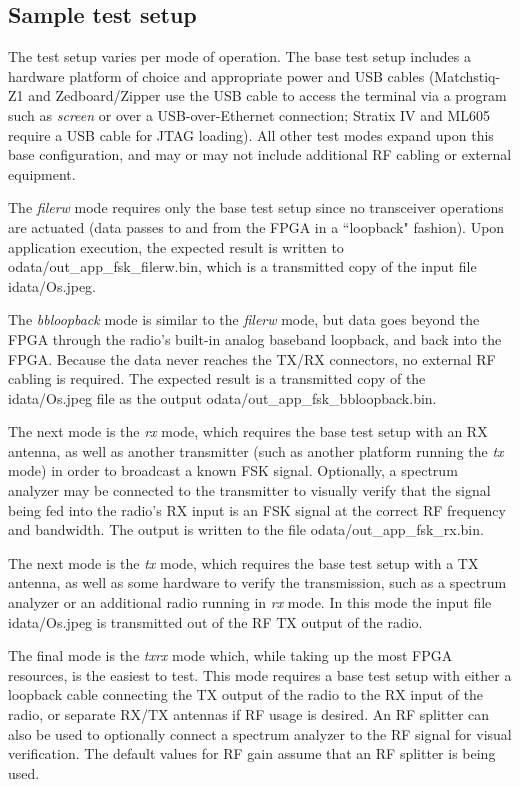 \subsection{Sample test setup}
The test setup varies per mode of operation. The base test setup includes a hardware platform of choice and appropriate power and USB cables (Matchstiq-Z1 and Zedboard/Zipper use the USB cable to access the terminal via a program such as \textit{screen} or over a USB-over-Ethernet connection; Stratix IV and ML605 require a USB cable for JTAG loading). All other test modes expand upon this base configuration, and may or may not include additional RF cabling or external equipment.\par\medskip
\noindent The \textit{filerw} mode requires only the base test setup since no transceiver operations are actuated (data passes to and from the FPGA in a ``loopback" fashion). Upon application execution, the expected result is written to odata/out\_app\_fsk\_filerw.bin, which is a transmitted copy of the input file idata/Os.jpeg.\par\medskip
\noindent The \textit{bbloopback} mode is similar to the \textit{filerw} mode, but data goes beyond the FPGA through the radio's built-in analog baseband loopback, and back into the FPGA. Because the data never reaches the TX/RX connectors, no external RF cabling is required. The expected result is a transmitted copy of the idata/Os.jpeg file as the output odata/out\_app\_fsk\_bbloopback.bin.\par\medskip
\noindent The next mode is the \textit{rx} mode, which requires the base test setup with an RX antenna, as well as another transmitter (such as another platform running the \textit{tx} mode) in order to broadcast a known FSK signal. Optionally, a spectrum analyzer may be connected to the transmitter to visually verify that the signal being fed into the radio's RX input is an FSK signal at the correct RF frequency and bandwidth. The output is written to the file odata/out\_app\_fsk\_rx.bin.\par\medskip
\noindent The next mode is the \textit{tx} mode, which requires the base test setup with a TX antenna, as well as some hardware to verify the transmission, such as a spectrum analyzer or an additional radio running in \textit{rx} mode. In this mode the input file idata/Os.jpeg is transmitted out of the RF TX output of the radio.\par\medskip
\noindent The final mode is the \textit{txrx} mode which, while taking up the most FPGA resources, is the easiest to test. This mode requires a base test setup with either a loopback cable connecting the TX output of the radio to the RX input of the radio, or separate RX/TX antennas if RF usage is desired. An RF splitter can also be used to optionally connect a spectrum analyzer to the RF signal for visual verification. The default values for RF gain assume that an RF splitter is being used.\par\medskip
